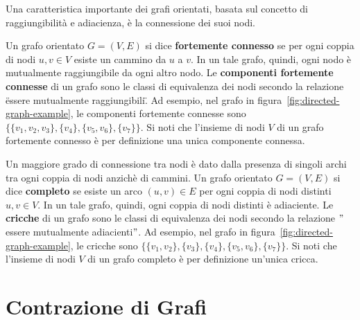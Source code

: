 Una caratteristica importante dei grafi orientati, basata sul concetto di raggiungibilit\`a e adiacienza,
\`e la connessione dei suoi nodi.
\newline

Un grafo orientato $G = (V, E)$ si dice \textbf{fortemente connesso} se per ogni coppia di nodi $u, v \in V$ esiste un
cammino da $u$ a $v$. \newline
In un tale grafo, quindi, ogni nodo \`e mutualmente raggiungibile da ogni altro nodo.
Le \textbf{componenti fortemente connesse} di un grafo sono le classi di equivalenza dei nodi secondo la relazione
\"essere mutualmente raggiungibili\".
Ad esempio, nel grafo in figura~\ref{fig:directed-graph-example}, le componenti fortemente connesse sono
$\{\{v_1, v_2, v_3\}, \{v_4\}, \{v_5, v_6\}, \{v_7\}\}$.
Si noti che l'insieme di nodi $V$ di un grafo fortemente connesso \`e per definizione una unica componente connessa.
\newline

Un maggiore grado di connessione tra nodi \`e dato dalla presenza di singoli archi tra ogni coppia di nodi anzich\`e
di cammini. \newline
Un grafo orientato $G = (V, E)$ si dice \textbf{completo} se esiste un arco $(u, v) \in E$ per ogni coppia di nodi
distinti $u, v \in V$.
In un tale grafo, quindi, ogni coppia di nodi distinti \`e adiaciente.
Le \textbf{cricche} di un grafo sono le classi di equivalenza dei nodi secondo la relazione
\("\)essere mutualmente adiacienti\("\).
Ad esempio, nel grafo in figura~\ref{fig:directed-graph-example}, le cricche sono
$\{\{v_1, v_2\}, \{v_3\}, \{v_4\}, \{v_5, v_6\}, \{v_7\}\}$.
Si noti che l'insieme di nodi $V$ di un grafo completo \`e per definizione un'unica cricca.
\newline


\section{Contrazione di Grafi}\label{sec:contrazione-di-grafi}

